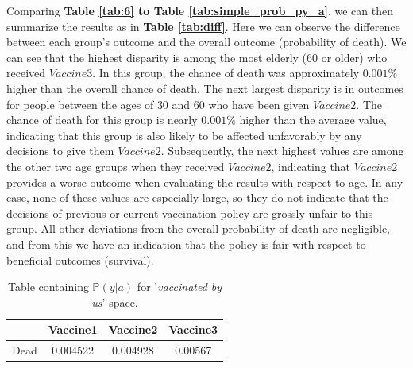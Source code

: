 \documentclass{article}
\begin{document}
Comparing \textbf{Table \ref{tab:6} to Table \ref{tab:simple_prob_py_a}}, we can then summarize the results as in \textbf{Table \ref{tab:diff}}. Here we can observe the difference between each group's outcome and the overall outcome (probability of death). We can see that the highest disparity is among the most elderly ($60$ or older) who received $Vaccine3$. In this group, the chance of death was approximately $0.001\%$ higher than the overall chance of death. The next largest disparity is in outcomes for people between the ages of $30$ and $60$ who have been given $Vaccine2$. The chance of death for this group is nearly $0.001\%$ higher than the average value, indicating that this group is also likely to be affected unfavorably by any decisions to give them $Vaccine2$. Subsequently, the next highest values are among the other two age groups when they received $Vaccine2$, indicating that $Vaccine2$ provides a worse outcome when evaluating the results with respect to age. In any case, none of these values are especially large, so they do not indicate that the decisions of previous or current vaccination policy are grossly unfair to this group. All other deviations from the overall probability of death are negligible, and from this we have an indication that the policy is fair with respect to beneficial outcomes (survival).

\begin{center}
\begin{table}[H]
\centering
    \begin{tabular}{ |c| c c c|}
    \hline
      & Vaccine1 &  Vaccine2 & Vaccine3  \\
    \hline
    Dead &  0.004522 &  0.004928 &   0.00567
     \\ \hline
    \end{tabular}
    \caption{Table containing $\mathbb{P}(y | a)$ for '\textit{vaccinated by us}' space.}
\end{table}
\end{center}
\end{document}
